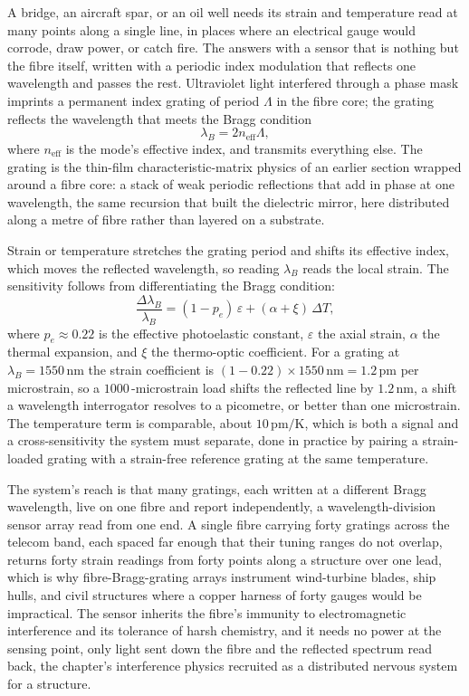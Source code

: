 A bridge, an aircraft spar, or an oil well needs its strain and temperature read at
many points along a single line, in places where an electrical gauge would corrode,
draw power, or catch fire. The  answers with a sensor
that is nothing but the fibre itself, written with a periodic index modulation that
reflects one wavelength and passes the rest. Ultraviolet light interfered through a
phase mask imprints a permanent index grating of period $\Lambda$ in the fibre
core; the grating reflects the wavelength that meets the Bragg condition
\[
\lambda_B = 2 n_{\mathrm{eff}}\Lambda,
\]
where $n_{\mathrm{eff}}$ is the mode's effective index, and transmits everything
else. The grating is the thin-film characteristic-matrix physics of an earlier
section wrapped around a fibre core: a stack of weak periodic reflections that add
in phase at one wavelength, the same recursion that built the dielectric mirror,
here distributed along a metre of fibre rather than layered on a substrate.

Strain or temperature stretches the grating period and shifts its effective index,
which moves the reflected wavelength, so reading $\lambda_B$ reads the local strain.
The sensitivity follows from differentiating the Bragg condition:
\[
\frac{\Delta\lambda_B}{\lambda_B} = (1 - p_e)\,\varepsilon + (\alpha + \xi)\,
\Delta T,
\]
where $p_e \approx 0.22$ is the effective photoelastic constant, $\varepsilon$ the
axial strain, $\alpha$ the thermal expansion, and $\xi$ the thermo-optic
coefficient. For a grating at $\lambda_B = 1550\,\si{\nano\meter}$ the strain
coefficient is $(1 - 0.22)\times 1550\,\si{\nano\meter} = 1.2\,\si{\pico\meter}$
per microstrain, so a $1000\,$-microstrain load shifts the reflected line by
$1.2\,\si{\nano\meter}$, a shift a wavelength interrogator resolves to a
picometre, or better than one microstrain. The temperature term is comparable,
about $10\,\si{\pico\meter}/\si{\kelvin}$, which is both a signal and a
cross-sensitivity the system must separate, done in practice by pairing a
strain-loaded grating with a strain-free reference grating at the same temperature.

The system's reach is that many gratings, each written at a different Bragg
wavelength, live on one fibre and report independently, a wavelength-division
sensor array read from one end. A single fibre carrying forty gratings across the
telecom band, each spaced far enough that their tuning ranges do not overlap,
returns forty strain readings from forty points along a structure over one lead,
which is why fibre-Bragg-grating arrays instrument wind-turbine blades, ship hulls,
and civil structures where a copper harness of forty gauges would be
impractical. The sensor inherits the fibre's immunity to electromagnetic
interference and its tolerance of harsh chemistry, and it needs no power at the
sensing point, only light sent down the fibre and the reflected spectrum read back,
the chapter's interference physics recruited as a distributed nervous system for a
structure.

